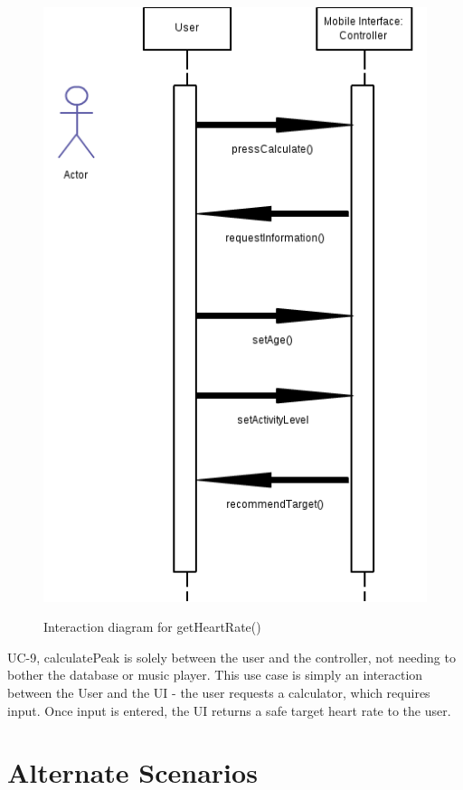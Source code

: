 \documentclass[letterpaper,english, 12pt]{scrreprt}
\begin{document}
\begin{figure}[H]
	\includegraphics[scale=.40]{img/Interaction_Diagrams/calculatePeak.png}\\
	\caption {Interaction diagram for getHeartRate()} 
\end{figure}

UC-9, calculatePeak is solely between the user and the controller, not needing to bother the database or music player. This use case is simply an interaction between the User and the UI - the user requests a calculator, which requires input. Once input is entered, the UI returns a safe target heart rate to the user. 


\section{Alternate Scenarios}
\end{document}
